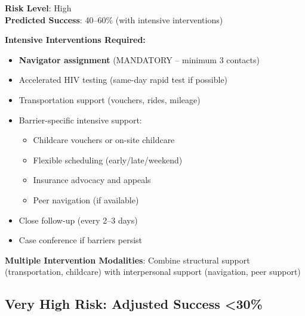 \documentclass[11pt]{article}
\begin{document}
\begin{tcolorbox}[colback=orange!15!white,colframe=orange!75!black,breakable]
\textbf{Risk Level}: High \\
\textbf{Predicted Success}: 40--60\% (with intensive interventions)

\textbf{Intensive Interventions Required:}
\begin{itemize}[leftmargin=*]
\item \textbf{Navigator assignment} (MANDATORY -- minimum 3 contacts)
\item Accelerated HIV testing (same-day rapid test if possible)
\item Transportation support (vouchers, rides, mileage)
\item Barrier-specific intensive support:
\begin{itemize}
\item Childcare vouchers or on-site childcare
\item Flexible scheduling (early/late/weekend)
\item Insurance advocacy and appeals
\item Peer navigation (if available)
\end{itemize}
\item Close follow-up (every 2--3 days)
\item Case conference if barriers persist
\end{itemize}

\textbf{Multiple Intervention Modalities}: Combine structural support (transportation, childcare) with interpersonal support (navigation, peer support)
\end{tcolorbox}

\subsection{Very High Risk: Adjusted Success <30\%}
\end{document}
